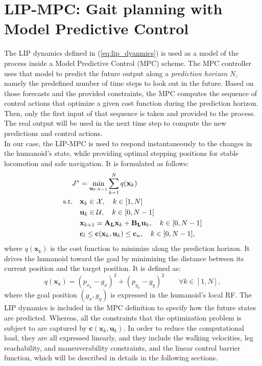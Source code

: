 \section{LIP-MPC: Gait planning with Model Predictive Control}\label{sec:mpc}
The LIP dynamics defined in (\ref{eq:lip_dyanmics}) is used as a model of the process inside a Model Predictive Control (MPC) scheme. The MPC controller uses that model to predict the future output along a \textit{prediction horizon} $N$, namely the predefined number of time steps to look out in the future. Based on those forecasts and the provided constraints, the MPC computes the sequence of control actions that optimize a given cost function during the prediction horizon. Then, only the first input of that sequence is taken and provided to the process. The real output will be used in the next time step to compute the new predictions and control actions.\\
In our case, the LIP-MPC is used to respond instantaneously to the changes in the humanoid's state, while providing optimal stepping positions for stable locomotion and safe navigation. It is formulated as follows:
\begin{align}
    J^* &= \min_{\mathbf{u}_{0:N-1}} \sum_{k=1}^{N} q(\mathbf{x}_k) \\
    \text{s.t.} \quad
    &\mathbf{x}_k \in \mathcal{X}, \quad k \in [1, N] \notag \\
    &\mathbf{u}_k \in \mathcal{U}, \quad k \in [0, N-1] \notag \\
    &\mathbf{x}_{k+1} = \mathbf{A_L} \mathbf{x}_k + \mathbf{B_L} \mathbf{u}_k, \quad k \in [0, N-1] \notag \\
    &\mathbf{c}_l \leq \mathbf{c}(\mathbf{x}_k, \mathbf{u}_k) \leq \mathbf{c}_u, \quad k \in [0, N-1], \notag
    \label{eq:lip-mpc}
\end{align}
where $q(\mathbf{x}_k)$ is the cost function to minimize along the prediction horizon. It drives the humanoid toward the goal by minimizing the distance between its current position and the target position. It is defined as:
$$
q(\mathbf{x}_k) = \left( p_{x_k} - g_x \right)^2 + \left( p_{y_k} - g_y \right)^2 \qquad \forall k \in \left[1, N\right],
$$
where the goal position $(g_x, g_y)$ is expressed in the humanoid's local RF. The LIP dynamics is included in the MPC definition to specify how the future states are predicted. Whereas, all the constraints that the optimization problem is subject to are captured by $\mathbf{c}(\mathbf{x}_k, \mathbf{u}_k)$. In order to reduce the computational load, they are all expressed linearly, and they include the walking velocities, leg reachability, and maneuverability constraints, and the linear control barrier function, which will be described in details in the following sections.

